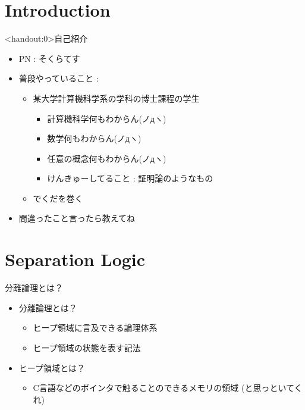 \documentclass[notheorems, aspectratio=169, 12pt, unicode]{beamer}
\begin{document}
\begin{frame}
 \titlepage
\end{frame}

 \section{Introduction}
 
 \begin{frame}<handout:0>{自己紹介}
  \begin{itemize}
   \item PN : そくらてす \pause
   \item 普段やっていること : \pause
	 \begin{itemize}
	  \item 某大学計算機科学系の学科の博士課程の学生 		\pause
		\begin{itemize}
		 \item \alert{計算機科学何もわからん(ノдヽ)} \pause
		 \item \alert{数学何もわからん(ノдヽ)} \pause
		 \item \alert{任意の概念何もわからん(ノдヽ)} \pause
		 \item けんきゅーしてること : 証明論のようなもの \pause
		\end{itemize}
	  \item {} でくだを巻く \pause 
	 \end{itemize}
   \item 間違ったこと言ったら教えてね
  \end{itemize} 
 \end{frame}
 
 \section{Separation Logic}

 \begin{frame}{分離論理とは？}
  \begin{itemize}
   \item \alert{分離論理}とは？ \pause
	 \begin{itemize}
	  \item \alert{ヒープ領域}に言及できる論理体系
	  \item \alert{ヒープ領域}の状態を表す記法 \pause
	 \end{itemize}
   \item \alert{ヒープ領域}とは？ \pause
	 \begin{itemize}
	  \item C言語などの\alert{ポインタ}で触ることのできるメモリの領域 \pause
		(と思っといてくれ) 
	 \end{itemize}
  \end{itemize} 
 \end{frame}
\end{document}

